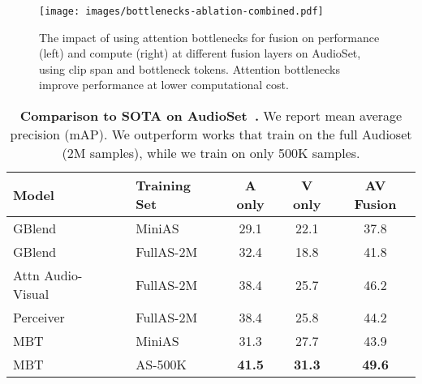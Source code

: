 \begin{figure}
    \centering
    \texttt{[image: images/bottlenecks-ablation-combined.pdf]}
    \caption{The impact of using attention bottlenecks for fusion on performance (left) and compute (right) at different fusion layers  on AudioSet, using clip span  and  bottleneck tokens. Attention bottlenecks improve performance at lower computational cost.
    }
    \label{fig:bottlenecks}
    \vspace{-\baselineskip}
\end{figure}
\begin{figure}
\begin{floatrow}
\end{floatrow}
\vspace{-\baselineskip}
\end{figure}
\begin{table}[h]
    \begin{tabular}{llccc}
    \toprule 
  Model & Training Set & A only & V only & AV Fusion \\
    \midrule 
    GBlend~\cite{wang2020makes}    & MiniAS &29.1 & 22.1 & 37.8 \\
    
    GBlend~\cite{wang2020makes}    & FullAS-2M & 32.4 & 18.8 & 41.8 \\
    Attn Audio-Visual~\cite{fayek2020large} & FullAS-2M & 38.4 & 25.7 & 46.2 \\
    Perceiver~\cite{jaegle2021perceiver} &  FullAS-2M & 38.4 & 25.8 & 44.2  \\
    \hdashline
    MBT & MiniAS & 31.3 & 27.7 & 43.9 \\
MBT & AS-500K & \textbf{41.5} & \textbf{31.3} & \textbf{49.6} \\
    \bottomrule 
    \end{tabular}
    \caption{\textbf{Comparison to SOTA on AudioSet~\cite{gemmeke2017audio}.} We report mean average precision (mAP). We outperform works that train on the full Audioset (2M samples), while we train on only 500K samples.}
    \label{tab:audioset-sota}
\end{table}

